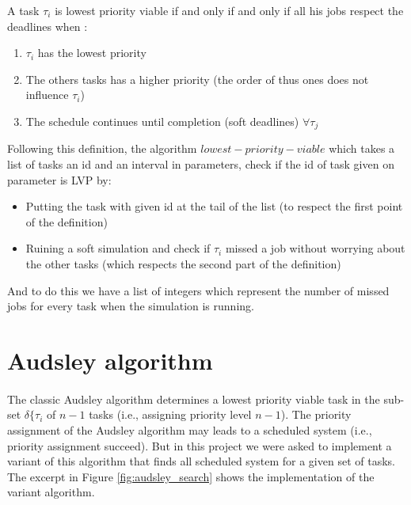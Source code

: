 \documentclass[letterpaper]{article}
\begin{document}
A task $\tau_{i}$ is lowest priority viable
if and only if and only if all his jobs respect the deadlines when :
\begin{enumerate}
    \item $\tau_{i}$ has the lowest priority
    \item The others tasks has a higher priority
    (the order of thus ones does not influence $\tau_{i}$)
    \item The schedule continues until completion
    (soft deadlines) $\forall \tau_{j}$
\end{enumerate}

Following this definition, the algorithm $lowest-priority-viable$
which takes a list of tasks an id and an interval in parameters,
 check if the id of task given on parameter is LVP by:

\begin{itemize}
    \item Putting the task with given id at the tail of the list
    (to respect the first point of the definition)
    \item Ruining a soft simulation and check if $\tau_{i}$
    missed a job without worrying about the other tasks
    (which respects the second part of the definition)
\end{itemize}
And to do this we have a list of integers which represent
the number of missed jobs for every task when the simulation is running.

\section{Audsley algorithm}

\paragraph{}

The classic Audsley algorithm determines a lowest priority viable
task in the sub-set $\delta \{\tau_{i}$ of $n-1$ tasks
(i.e., assigning priority level $n-1$). The priority assignment
of the Audsley algorithm may leads to a scheduled system
(i.e., priority assignment succeed). But in this project
we were asked to implement a variant of this algorithm
that finds all scheduled system for a given set of tasks.
The excerpt in Figure \ref{fig:audsley_search} shows the implementation of
the variant algorithm.
\end{document}
